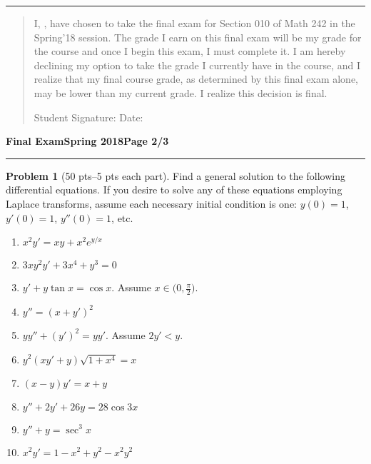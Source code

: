 \documentclass[12pt]{article}
\theoremstyle{definition}
\newtheorem{problem}{Problem}
\begin{document}
\hrule

\vspace{0.6cm}

\begin{quotation}
\noindent I, \makebox[8cm]{\hrulefill}, have chosen to take the final exam for Section 010 of Math 242 in the Spring'18 session.  The grade I earn on this final exam will be my grade for the course and once I begin this exam, I must complete it.  I am hereby declining my option to take the grade I currently have in the course, and I realize that my final course grade, as determined by this final exam alone, may be lower than my current grade.  I realize this decision is final.

\vspace{1cm}

\noindent Student Signature: \makebox[8cm]{\hrulefill} Date: \makebox[3cm]{\hrulefill}


\end{quotation}
\newpage

\hfill{\large\bf Final Exam}\hfill{\large\bf Spring 2018}\hfill{\large\bf Page 2/3}\hrule

\bigskip
\begin{problem}[50 pts--5 pts each part]
Find a general solution to the following differential equations.  If you desire to solve any of these equations employing Laplace transforms, assume each necessary initial condition is one: $y(0)=1$, $y'(0)=1$, $y''(0)=1$, etc.
\begin{enumerate}
\item $x^2y'=xy+x^2e^{y/x}$  %
\item $3xy^2y' + 3x^4+y^3 = 0$  %
\item $y'+y\tan x = \cos x$.  Assume $x \in \big( 0, \tfrac{\pi}{2} \big)$.  %
\item $y''=(x+y')^2$  %
\item $yy''+(y')^2=yy'$.  Assume $2y'<y$. %
\item $y^2(xy'+y)\sqrt{1+x^4}=x$ %
\item $(x-y)y'=x+y$ %
\item $y''+2y'+26y=28\cos 3x$ %
\item $y''+y=\sec^3 x$ %
\item $x^2y' = 1-x^2+y^2-x^2y^2$   %
\end{enumerate}
\end{problem}
\end{document}
